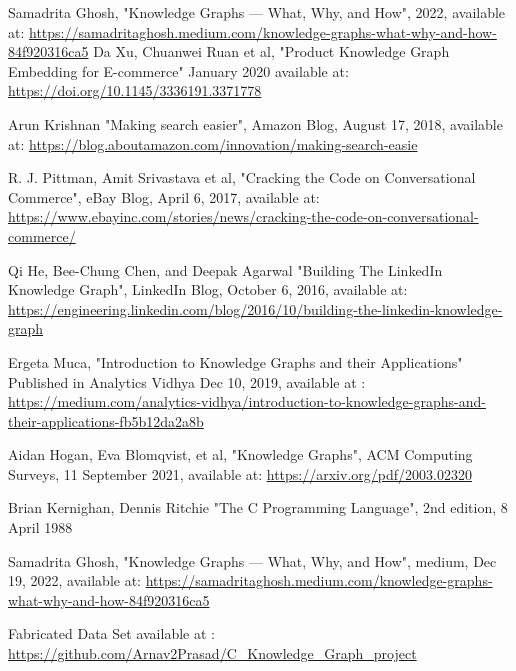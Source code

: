 \documentclass[conference]{IEEEtran}
\begin{document}


\begin{thebibliography}{00}

 Samadrita Ghosh, "Knowledge Graphs — What, Why, and How", 2022, available at: \url{https://samadritaghosh.medium.com/knowledge-graphs-what-why-and-how-84f920316ca5}
 Da Xu, Chuanwei Ruan et al, "Product Knowledge Graph Embedding for E-commerce"  January 2020 available at: \url{https://doi.org/10.1145/3336191.3371778}

 Arun Krishnan "Making search easier", Amazon Blog, August 17, 2018, available at: \url{https://blog.aboutamazon.com/innovation/making-search-easie}

 R. J. Pittman, Amit Srivastava et al, "Cracking the Code on Conversational Commerce", eBay Blog,  April 6, 2017, available at:  \url{https://www.ebayinc.com/stories/news/cracking-the-code-on-conversational-commerce/}

Qi He, Bee-Chung Chen, and Deepak Agarwal "Building The
LinkedIn Knowledge Graph", LinkedIn Blog,  October 6, 2016, available at: \url{https://engineering.linkedin.com/blog/2016/10/building-the-linkedin-knowledge-graph}


 Ergeta Muca, "Introduction to Knowledge Graphs and their Applications" Published in
Analytics Vidhya Dec 10, 2019, available 
at : \url{https://medium.com/analytics-vidhya/introduction-to-knowledge-graphs-and-their-applications-fb5b12da2a8b}

 Aidan Hogan, Eva Blomqvist, et al, "Knowledge Graphs", ACM
Computing Surveys, 11 September 2021,  available at: \url{https://arxiv.org/pdf/2003.02320}

 Brian Kernighan, Dennis Ritchie "The C Programming Language", 2nd edition, 8 April 1988

 Samadrita Ghosh, "Knowledge Graphs — What, Why, and How", medium, Dec 19, 2022, available at: \url{https://samadritaghosh.medium.com/knowledge-graphs-what-why-and-how-84f920316ca5}

 Fabricated Data Set available at : \url{https://github.com/Arnav2Prasad/C_Knowledge_Graph_project}


\end{thebibliography}
\end{document}
